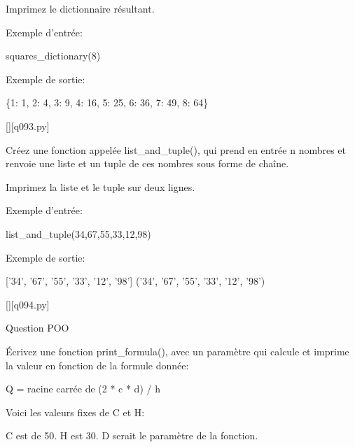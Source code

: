 		Imprimez le dictionnaire résultant.
		
		Exemple d'entrée:
		
		squares\_dictionary(8)
		
		Exemple de sortie:
		
		\{1: 1, 2: 4, 3: 9, 4: 16, 5: 25, 6: 36, 7: 49, 8: 64\}
		\par
		\renewcommand{\nomfichier}{q093.py}
		\begin{solution}
		    \pythonfile{\chemincode \nomfichier}[][\nomfichier]
		\end{solution}
        
		\question
		Créez une fonction appelée list\_and\_tuple(), qui prend en entrée n nombres et renvoie une liste et un tuple de ces nombres sous forme de chaîne.
		
		Imprimez la liste et le tuple sur deux lignes.
		
		Exemple d'entrée:
		
		list\_and\_tuple(34,67,55,33,12,98)
		
		Exemple de sortie:
		
		['34', '67', '55', '33', '12', '98']
		('34', '67', '55', '33', '12', '98')
		\par
		\renewcommand{\nomfichier}{q094.py}
		\begin{solution}
		    \pythonfile{\chemincode \nomfichier}[][\nomfichier]
		\end{solution}
        
		\question
Question POO
%		
%		

		\question
		Écrivez une fonction print\_formula(), avec un paramètre qui calcule et imprime la valeur en fonction de la formule donnée:
		
		Q = racine carrée de (2 * c * d) / h
		
		Voici les valeurs fixes de C et H:
		
		C est de 50.\newline
		H est 30.\newline
		D serait le paramètre de la fonction.
		
